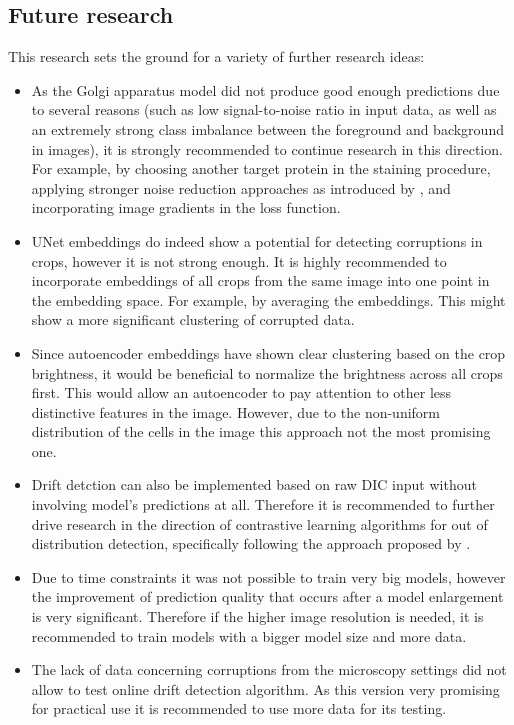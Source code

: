 \subsection{Future research}
This research sets the ground for a variety of further research ideas:
\begin{itemize}
    \item As the Golgi apparatus model did not produce good enough predictions due to several reasons (such as low signal-to-noise ratio in input data, as well as an extremely strong class imbalance between the foreground and background in images), it is strongly recommended to continue research in this direction. For example, by choosing another target protein in the staining procedure, applying stronger noise reduction approaches as introduced by \cite{noise2void}, and incorporating image gradients in the loss function.
    \item UNet embeddings do indeed show a potential for detecting corruptions in crops, however it is not strong enough. It is highly recommended to incorporate embeddings of all crops from the same image into one point in the embedding space. For example, by averaging the embeddings. This might show a more significant clustering of corrupted data.
    \item Since autoencoder embeddings have shown clear clustering based on the crop brightness, it would be beneficial to normalize the brightness across all crops first. This would allow an autoencoder to pay attention to other less distinctive features in the image. However, due to the non-uniform distribution of the cells in the image this approach not the most promising one.
    \item Drift detction can also be implemented based on raw DIC input without involving model's predictions at all. Therefore it is recommended to further drive research in the direction of contrastive learning algorithms for out of distribution detection, specifically following the approach proposed by \cite{csi}.
    \item Due to time constraints it was not possible to train very big models, however the improvement of prediction quality that occurs after a model enlargement is very significant. Therefore if the higher image resolution is needed, it is recommended to train models with a bigger model size and more data.
    \item The lack of data concerning corruptions from the microscopy settings did not allow to test online drift detection algorithm. As this version very promising for practical use it is recommended to use more data for its testing.

\end{itemize}
